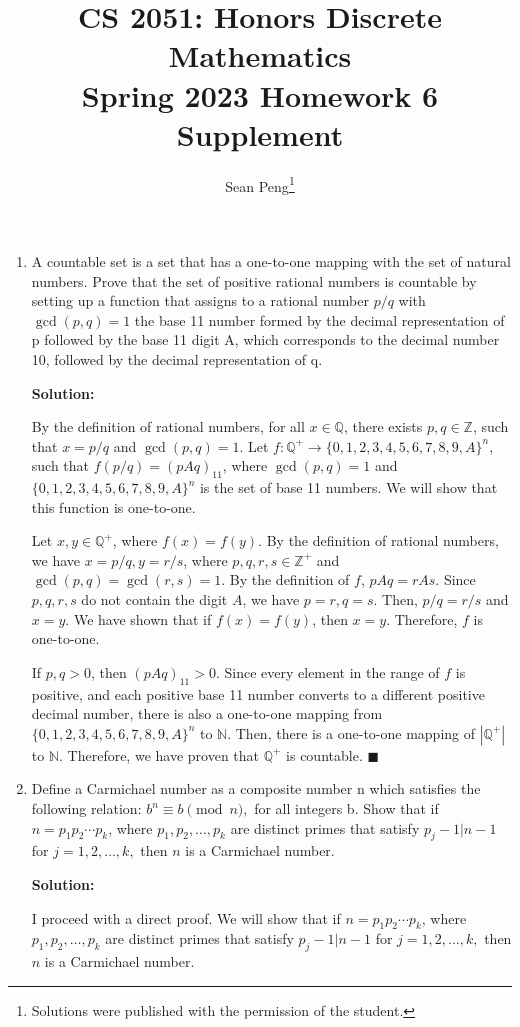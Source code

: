 \documentclass{article}
\title{\vspace{-1cm}CS 2051: Honors Discrete Mathematics \\Spring 2023 Homework 6 Supplement}
\author{Sean Peng\footnote{Solutions were published with the permission of the student.}}
\date{}
\newenvironment{solution}
{
\par
\medskip
\color{blue}
\textbf{Solution:}
}
{
\medskip
\par
}
\begin{document}
\maketitle
\begin{enumerate}
    \item A countable set is a set that has a one-to-one mapping with the set of natural numbers. Prove that the set of positive rational numbers is countable by setting up a function that assigns to a rational number $p/q$ with $\gcd (p, q) = 1$ the base 11 number formed by the decimal representation of p followed by the base 11 digit A, which corresponds to the decimal number 10, followed by the decimal representation of q. 
    \begin{solution}
        By the definition of rational numbers, for all $x \in \mathbb{Q}$, there exists $p, q \in \mathbb{Z}$, such that $x = p / q$ and $ \gcd(p, q) = 1$. Let $f: \mathbb{Q}^+ \rightarrow \{0, 1, 2, 3, 4, 5, 6, 7, 8, 9, A\}^n$, such that $f(p / q) = (pAq)_{11}$, where $\gcd(p, q) = 1$ and $\{0, 1, 2, 3, 4, 5, 6, 7, 8, 9, A\}^n$ is the set of base 11 numbers. We will show that this function is one-to-one.

        \medskip
        Let $x, y \in \mathbb{Q}^+$, where $f(x) = f(y)$. By the definition of rational numbers, we have $x = p / q, y = r / s$, where $p, q, r, s \in \mathbb{Z}^+$ and $\gcd(p, q) = \gcd(r, s) = 1$. By the definition of $f$, $pAq = rAs$. Since $p, q, r, s$ do not contain the digit $A$, we have $p = r, q = s$. Then, $p / q = r / s$ and $x = y$. We have shown that if $f(x) = f(y)$, then $x = y$. Therefore, $f$ is one-to-one.

        \medskip
        If $p, q > 0$, then $(pAq)_{11} > 0$. Since every element in the range of $f$ is positive, and each positive base 11 number converts to a different positive decimal number, there is also a one-to-one mapping from $\{0, 1, 2, 3, 4, 5, 6, 7, 8, 9, A\}^n$ to $\mathbb{N}$. Then, there is a one-to-one mapping of $|\mathbb{Q}^+|$ to $\mathbb{N}$. Therefore, we have proven that $\mathbb{Q}^+$ is countable. $\blacksquare$
    \end{solution}

    \item Define a Carmichael number as a composite number n which satisfies the following relation: $b^n \equiv b \pmod{n},$ for all integers b.
    Show that if $n = p_1p_2 \cdots p_k$, where $p_1, p_2, \dots, p_k$ are distinct primes that satisfy $p_j - 1 \vert n - 1$ for $j = 1, 2, \dots, k,$ then $n$ is a Carmichael number.
    \begin{solution}
        I proceed with a direct proof. We will show that if $n = p_1p_2 \cdots p_k$, where $p_1, p_2, \dots, p_k$ are distinct primes that satisfy $p_j - 1 \vert n - 1$ for $j = 1, 2, \dots, k,$ then $n$ is a Carmichael number.


\end{solution}
\end{enumerate}
\end{document}
